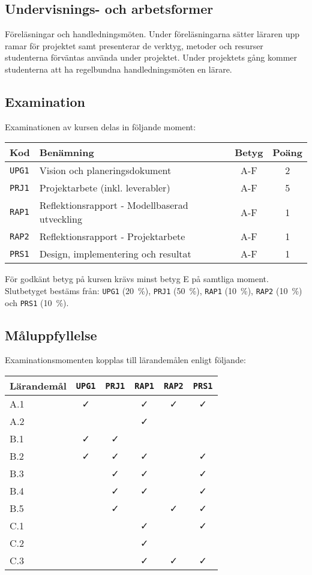 \subsection*{Undervisnings- och
arbetsformer}

Föreläsningar och handledningsmöten. Under föreläsningarna sätter
läraren upp ramar för projektet samt presenterar de verktyg, metoder och
resurser studenterna förväntas använda under projektet. Under projektets
gång kommer studenterna att ha regelbundna handledningsmöten en lärare.

\subsection*{Examination}

Examinationen av kursen delas in följande moment:

\begin{longtable}[]{@{}llcc@{}}
\toprule
\textsf{Kod} & \textsf{Benämning} & \textsf{Betyg} & \textsf{Poäng}\tabularnewline
\midrule
\endhead
\texttt{UPG1} & Vision och planeringsdokument & A-F & 2\tabularnewline
\texttt{PRJ1} & Projektarbete (inkl. leverabler) & A-F & 5\tabularnewline
\texttt{RAP1} & Reflektionsrapport - Modellbaserad utveckling & A-F &
1\tabularnewline
\texttt{RAP2} & Reflektionsrapport - Projektarbete & A-F & 1\tabularnewline
\texttt{PRS1} & Design, implementering och resultat & A-F & 1\tabularnewline
\bottomrule
\end{longtable}

För godkänt betyg på kursen krävs minst betyg E på samtliga moment.
Slutbetyget bestäms från: \texttt{UPG1} (20~\%), \texttt{PRJ1} (50~\%), \texttt{RAP1} (10~\%), \texttt{RAP2}
(10~\%) och \texttt{PRS1} (10~\%).

\subsection*{Måluppfyllelse}

Examinationsmomenten kopplas till lärandemålen enligt följande:

\begin{longtable}[]{@{}lccccc@{}}
\toprule
\textsf{Lärandemål} & \texttt{UPG1} & \texttt{PRJ1} & \texttt{RAP1} & \texttt{RAP2} & \texttt{PRS1}\tabularnewline
\midrule
\endhead
A.1 & \faCheck & & \faCheck & \faCheck & \faCheck\tabularnewline
A.2 & & & \faCheck & &\tabularnewline
B.1 & \faCheck & \faCheck & & &\tabularnewline
B.2 & \faCheck & \faCheck & \faCheck & & \faCheck\tabularnewline
B.3 & & \faCheck & \faCheck & & \faCheck\tabularnewline
B.4 & & \faCheck & \faCheck & & \faCheck\tabularnewline
B.5 & & \faCheck & & \faCheck & \faCheck\tabularnewline
C.1 & & & \faCheck & & \faCheck\tabularnewline
C.2 & & & \faCheck & &\tabularnewline
C.3 & & & \faCheck & \faCheck & \faCheck\tabularnewline
\bottomrule
\end{longtable}

